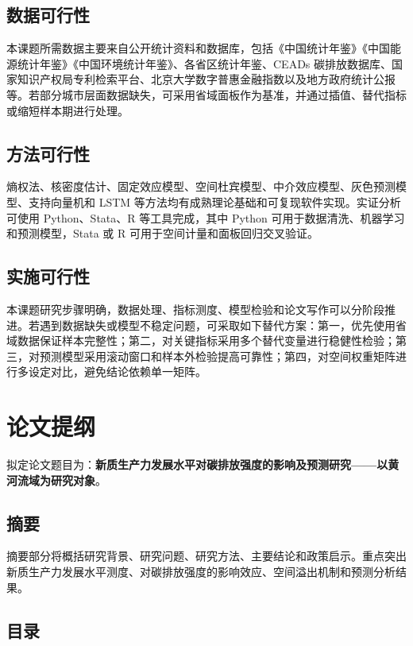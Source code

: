 \documentclass[UTF8,a4paper,zihao=-4,fontset=windows]{ctexart}
\newcommand{\reporttitle}{新质生产力发展水平对碳排放强度的影响及预测研究}
\newcommand{\regionscope}{黄河流域}
\begin{document}
\subsection{数据可行性}

本课题所需数据主要来自公开统计资料和数据库，包括《中国统计年鉴》《中国能源统计年鉴》《中国环境统计年鉴》、各省区统计年鉴、CEADs 碳排放数据库、国家知识产权局专利检索平台、北京大学数字普惠金融指数以及地方政府统计公报等。若部分城市层面数据缺失，可采用省域面板作为基准，并通过插值、替代指标或缩短样本期进行处理。

\subsection{方法可行性}

熵权法、核密度估计、固定效应模型、空间杜宾模型、中介效应模型、灰色预测模型、支持向量机和 LSTM 等方法均有成熟理论基础和可复现软件实现。实证分析可使用 Python、Stata、R 等工具完成，其中 Python 可用于数据清洗、机器学习和预测模型，Stata 或 R 可用于空间计量和面板回归交叉验证。

\subsection{实施可行性}

本课题研究步骤明确，数据处理、指标测度、模型检验和论文写作可以分阶段推进。若遇到数据缺失或模型不稳定问题，可采取如下替代方案：第一，优先使用省域数据保证样本完整性；第二，对关键指标采用多个替代变量进行稳健性检验；第三，对预测模型采用滚动窗口和样本外检验提高可靠性；第四，对空间权重矩阵进行多设定对比，避免结论依赖单一矩阵。

\section{论文提纲}

拟定论文题目为：\textbf{\reporttitle ——以\regionscope 为研究对象}。

\subsection{摘要}

摘要部分将概括研究背景、研究问题、研究方法、主要结论和政策启示。重点突出新质生产力发展水平测度、对碳排放强度的影响效应、空间溢出机制和预测分析结果。

\subsection{目录}
\end{document}
